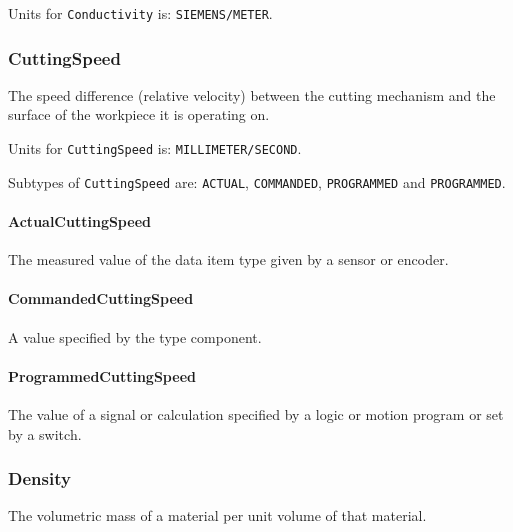 Units for \texttt{Conductivity} is: \texttt{SIEMENS/METER}.

\FloatBarrier

\subsubsection{CuttingSpeed}
\label{sec:CuttingSpeed}



The speed difference (relative velocity) between the cutting mechanism and the surface of the workpiece it is operating on.


Units for \texttt{CuttingSpeed} is: \texttt{MILLIMETER/SECOND}.


Subtypes of \texttt{CuttingSpeed} are: \texttt{ACTUAL}, \texttt{COMMANDED}, \texttt{PROGRAMMED} and \texttt{PROGRAMMED}. 
\FloatBarrier

\paragraph{ActualCuttingSpeed}\mbox{}
\label{sec:ActualCuttingSpeed}



The measured value of the data item type given by a sensor or encoder.


\paragraph{CommandedCuttingSpeed}\mbox{}
\label{sec:CommandedCuttingSpeed}



A value specified by the  type component.


\paragraph{ProgrammedCuttingSpeed}\mbox{}
\label{sec:ProgrammedCuttingSpeed}



The value of a signal or calculation specified by a logic or motion program or set by a switch.


\subsubsection{Density}
\label{sec:Density}



The volumetric mass of a material per unit volume of that material.


